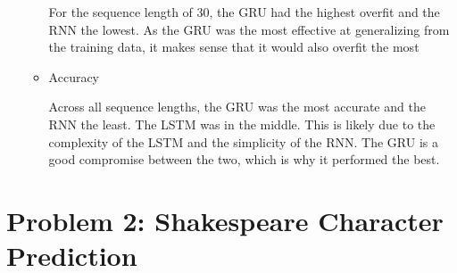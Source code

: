 \documentclass{article}
\begin{document}
\begin{enumerate}[label=1\alph*. ]
\begin{itemize}
            For the sequence length of 30, the GRU had the
            highest overfit and the RNN the lowest. As the
            GRU was the most effective at generalizing from
            the training data, it makes sense that it would
            also overfit the most
        
        \item Accuracy
        
            Across all sequence lengths, the GRU was the
            most accurate and the RNN the least. The LSTM
            was in the middle. This is likely due to the
            complexity of the LSTM and the simplicity of the
            RNN. The GRU is a good compromise between the
            two, which is why it performed the best.

    
    \end{itemize}

\end{enumerate}

\section{Problem 2: Shakespeare Character Prediction}
\end{document}
